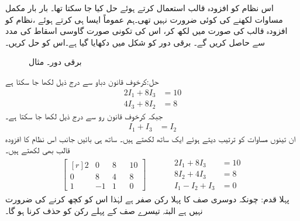 اس نظام کو افزودہ قالب استعمال کرتے ہوئے حل کیا جا سکتا تھا۔ بار بار مکمل مساوات لکھنے کی کوئی ضرورت نہیں تھی۔ہم عموماً ایسا ہی کرتے ہوئے ،نظام کو افزودہ قالب کی صورت میں لکھ کر، اس کی تکونی صورت گاوسی اسقاط کی مدد سے حاصل کریں گے۔  
برقی دور کو شکل  میں دکھایا گیا ہے۔اس کو حل کریں۔
\begin{figure}
\centering
{}
\caption{برقی دور۔ مثال }
\label{شکل_مثال_الجبرا_دور_گاوسی_اسقاط}
\end{figure}
حل:کرخوف قانون دباو سے درج ذیل لکھا جا سکتا ہے
\begin{align*}
2I_1+8I_3&=10\\
4I_3+8I_2&=8
\end{align*}
جبکہ کرخوف قانون رو سے درج ذیل لکھا جا سکتا ہے۔
\begin{align*}
I_1+I_3&=I_2
\end{align*}
ان تینوں مساوات کو ترتیب دیتے ہوئے ایک ساتھ لکھتے ہیں۔ ساتھ ہی بائیں جانب اس نظام کا افزودہ قالب بھی لکھتے ہیں۔
\begin{gather*}
\begin{bmatrix*}[r]2&0&8&&10\\0&8&4&&8\\
1&-1&1&&0  \end{bmatrix*}\quad \quad \quad 
\begin{aligned}
2I_1+8I_3&=10\\
8I_2+4I_3&=8\\
I_1-I_2+I_3&=0
\end{aligned}
\end{gather*}
پہلا قدم: چونکہ دوسری صف کا پہلا رکن صفر ہے لہٰذا اس کو کچھ کرنے کی ضرورت نہیں ہے البتہ تیسرے صف کے پہلے رکن  کو حذف کرنا ہو گا۔

